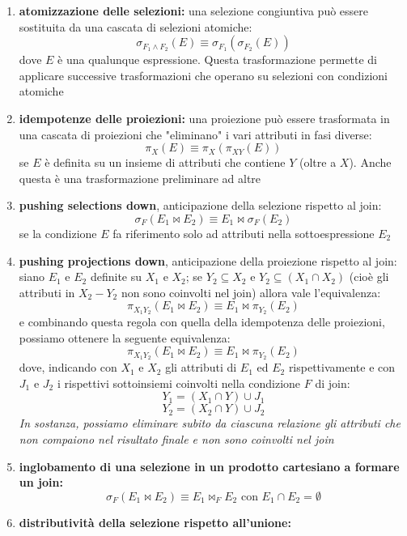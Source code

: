 \documentclass[a4paper,12pt, oneside]{book}
\begin{document}
\begin{enumerate}
\item \textbf{atomizzazione delle selezioni:} una selezione congiuntiva può essere sostituita
  da una cascata di selezioni atomiche:
  \[\sigma_{F_{1} \wedge F_{2}}(E) \equiv \sigma_{F_{1}}\left(\sigma_{F_{2}}(E)\right)\]
  dove $E$ è una qualunque espressione. Questa trasformazione permette di
  applicare successive trasformazioni che operano su selezioni con condizioni atomiche
\item \textbf{idempotenze delle proiezioni:} una proiezione può essere trasformata in una
  cascata di proiezioni che "eliminano" i vari attributi in fasi diverse:
  \[\pi_{X}(E) \equiv \pi_{X}\left(\pi_{X Y}(E)\right)\]
  se $E$ è definita su un insieme di attributi che contiene $Y$ (oltre a $X$). Anche
questa è una trasformazione preliminare ad altre
\item \textbf{pushing selections down}, anticipazione della selezione rispetto al join:
  \[\sigma_{F}\left(E_{1} \Join E_{2}\right) \equiv E_{1} \Join \sigma_{F}\left(E_{2}\right)\]
  se la condizione $E$ fa riferimento solo ad attributi nella sottoespressione $E_2$
\item \textbf{pushing projections down}, anticipazione della proiezione rispetto al join:
  siano $E_1$ e $E_2$ definite su $X_1$ e $X_2$; se $Y_2\subseteq X_2$ e $Y_2\subseteq (X_1\cap X_2)$ (cioè gli attributi in $X_2-Y_2$ non sono coinvolti nel join) allora vale l'equivalenza:
  \[\pi_{X_{1} Y_{2}}\left(E_{1} \Join E_{2}\right) \equiv E_{1} \Join \pi_{Y_{2}}\left(E_{2}\right)\]
  e combinando questa regola con quella della idempotenza delle proiezioni, possiamo ottenere la seguente equivalenza:
  \[\pi_{X_{1} Y_{2}}\left(E_{1} \Join E_{2}\right) \equiv E_{1} \Join \pi_{Y_{2}}\left(E_{2}\right)\]
  dove, indicando con $X_1$ e $X_2$ gli attributi di $E_1$ ed $E_2$ rispettivamente e con $J_1$
  e $J_2$ i rispettivi sottoinsiemi coinvolti nella condizione $F$ di join:
  \[Y_{1}=\left(X_{1} \cap Y\right) \cup J_{1}\]
  \[Y_{2}=\left(X_{2} \cap Y\right) \cup J_{2}\]
  \textit{In sostanza, possiamo eliminare subito da ciascuna relazione gli attributi che
non compaiono nel risultato finale e non sono coinvolti nel join}
\item \textbf{inglobamento di una selezione in un prodotto cartesiano a formare un join:}
  \[\sigma_{F}\left(E_{1} \Join E_{2}\right) \equiv E_{1} \Join_{F} E_{2}\mbox{ con }E_1\cap E_2=\emptyset\]
\item \textbf{distributività della selezione rispetto all'unione:}

\end{enumerate}
\end{document}

